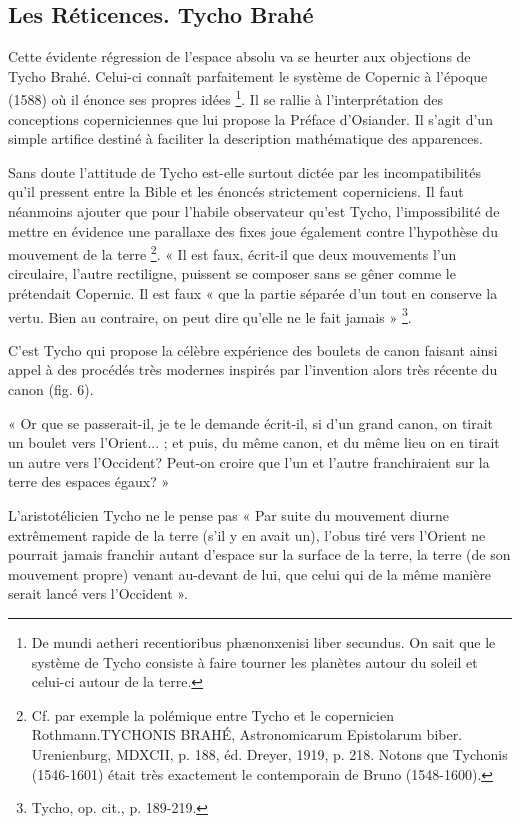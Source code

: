 \subsection{Les Réticences. Tycho Brahé}

Cette évidente régression de l’espace absolu va se heurter aux objections
de Tycho Brahé. Celui-ci connaît parfaitement le système de
Copernic à l’époque (1588) où il énonce ses propres idées \footnote{De mundi aetheri recentioribus phænonxenisi liber secundus. On sait que le
système de Tycho consiste à faire tourner les planètes autour du soleil et celui-ci
autour de la terre.}. Il se
rallie à l’interprétation des conceptions coperniciennes que lui propose
la Préface d’Osiander. Il s’agit d’un simple artifice destiné à faciliter la
description mathématique des apparences.

Sans doute l’attitude de Tycho est-elle surtout dictée par les incompatibilités
qu’il pressent entre la Bible et les énoncés strictement coperniciens.
Il faut néanmoins ajouter que pour l’habile observateur qu’est
Tycho, l’impossibilité de mettre en évidence une parallaxe des fixes joue
également contre l’hypothèse du mouvement de la terre \footnote{Cf. par exemple la polémique entre Tycho et le copernicien Rothmann.TYCHONIS BRAHÉ, Astronomicarum Epistolarum biber. Urenienburg, MDXCII,
p. 188, éd. Dreyer, 1919, p. 218. Notons que Tychonis (1546-1601) était très exactement
le contemporain de Bruno (1548-1600).}. « Il est faux,
écrit-il que deux mouvements l’un circulaire, l’autre rectiligne, puissent
se composer sans se gêner comme le prétendait Copernic. Il est faux
« que la partie séparée d’un tout en conserve la vertu. Bien au contraire,
on peut dire qu’elle ne le fait jamais » \footnote{Tycho, op. cit., p. 189-219.}.

C’est Tycho qui propose la célèbre expérience des boulets de canon
faisant ainsi appel à des procédés très modernes inspirés par l’invention
alors très récente du canon (fig. 6).

« Or que se passerait-il, je te le demande écrit-il, si d’un grand canon,
on tirait un boulet vers l'Orient... ; et puis, du même canon, et du même
lieu on en tirait un autre vers l'Occident? Peut-on croire que l’un et
l’autre franchiraient sur la terre des espaces égaux? »

L’aristotélicien Tycho ne le pense pas « Par suite du mouvement
diurne extrêmement rapide de la terre (s’il y en avait un), l’obus tiré vers
l’Orient ne pourrait jamais franchir autant d’espace sur la surface de la
terre, la terre (de son mouvement propre) venant au-devant de lui, que
celui qui de la même manière serait lancé vers l'Occident ».


